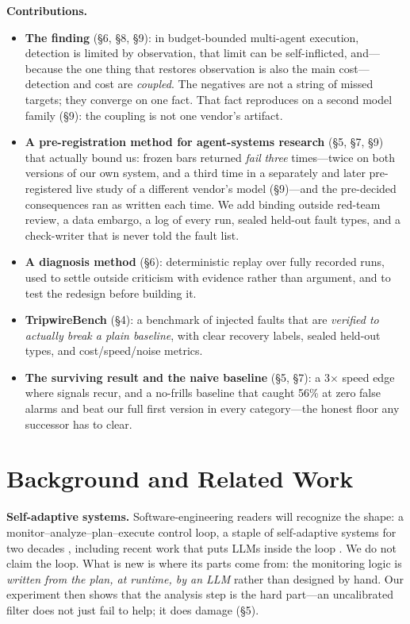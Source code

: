 \documentclass[acmsmall,screen]{acmart}
\begin{document}
\textbf{Contributions.}
\begin{itemize}
  \item \textbf{The finding} (\S6, \S8, \S9): in budget-bounded multi-agent
  execution, detection is limited by observation, that limit can be
  self-inflicted, and---because the one thing that restores observation is also
  the main cost---detection and cost are \emph{coupled}. The negatives are not
  a string of missed targets; they converge on one fact. That fact reproduces on
  a second model family (\S9): the coupling is not one vendor's artifact.
  \item \textbf{A pre-registration method for agent-systems research} (\S5,
  \S7, \S9) that actually bound us: frozen bars returned \emph{fail} \emph{three}
  times---twice on both versions of our own system, and a third time in a
  separately and later pre-registered live study of a different vendor's model
  (\S9)---and the pre-decided consequences ran as written each time. We add
  binding outside red-team review, a data embargo, a log of every run, sealed
  held-out fault types, and a check-writer that is never told the fault list.
  \item \textbf{A diagnosis method} (\S6): deterministic replay over fully
  recorded runs, used to settle outside criticism with evidence rather than
  argument, and to test the redesign before building it.
  \item \textbf{TripwireBench} (\S4): a benchmark of injected faults that are
  \emph{verified to actually break a plain baseline}, with clear recovery
  labels, sealed held-out types, and cost/speed/noise metrics.
  \item \textbf{The surviving result and the naive baseline} (\S5, \S7): a
  3$\times$ speed edge where signals recur, and a no-frills baseline that
  caught 56\% at zero false alarms and beat our full first version in every
  category---the honest floor any successor has to clear.
\end{itemize}

\section{Background and Related Work}
\textbf{Self-adaptive systems.} Software-engineering readers will recognize the
shape: a monitor--analyze--plan--execute control loop, a staple of
self-adaptive systems for two decades \cite{ref23, ref24}, including recent work
that puts LLMs inside the loop \cite{ref25, ref26}. We do not claim the loop.
What is new is where its parts come from: the monitoring logic is \emph{written
from the plan, at runtime, by an LLM} rather than designed by hand. Our
experiment then shows that the analysis step is the hard part---an uncalibrated
filter does not just fail to help; it does damage (\S5).
\end{document}

